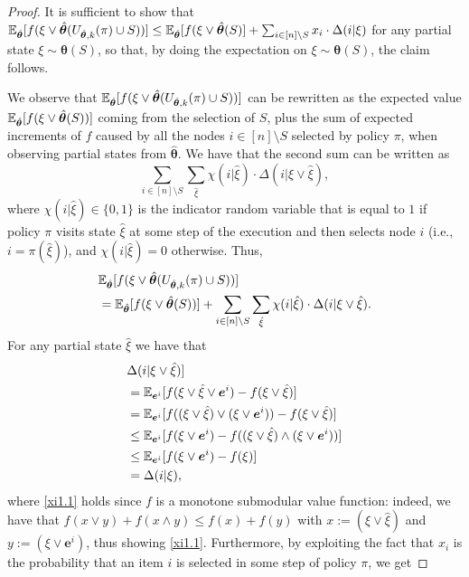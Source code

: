 \begin{proof}
It is sufficient to show that $\mathbb{E}_{\hat{\bm \theta}}[f(\xi\vee\hat{\bm \theta}(U_{\hat{\bm\theta},k}(\pi)\cup S))]\leq \mathbb{E}_{\hat{\bm \theta}}[f(\xi\vee\hat{\bm \theta}(S)]+\sum_{i\in [n]\setminus S}x_i\cdot \Delta(i|\xi)$ for any partial state $\xi\sim \bm\theta(S)$, so that, by doing the expectation on $\xi\sim\bm\theta(S)$, the claim follows. 

We observe that $\mathbb{E}_{\hat{\bm \theta}}[f(\xi\vee\hat{\bm \theta}(U_{\hat{\bm\theta},k}(\pi)\cup S))]$ can be rewritten as the expected value $\mathbb{E}_{\hat{\bm \theta}}[f(\xi\vee\hat{\bm \theta}(S))]$ coming from the selection of $S$, plus the sum of expected increments of $f$ caused by all the nodes $i\in [n]\setminus S$ selected by policy $\pi$, when observing partial states from $\hat{\bm \theta}$. We have that the second sum can be written as  $$\sum_{i\in [n]\setminus S}\sum_{\hat{\xi}}\chi(i|\hat{\xi})\cdot \Delta(i|\xi\vee \hat{\xi}),$$ where $\chi(i|\hat{\xi})\in \{0,1\}$ is the indicator random variable that is equal to $1$ if policy $\pi$ visits state $\hat{\xi}$ at some step of the execution and then selects node $i$ (i.e., $i=\pi(\hat{\xi})$), and $\chi(i|\hat{\xi})=0$ otherwise. Thus,
\begin{align}
&\mathbb{E}_{\hat{\bm \theta}}[f(\xi\vee\hat{\bm \theta}(U_{\hat{\bm\theta},k}(\pi)\cup S))]\nonumber\\
&=\mathbb{E}_{\hat{\bm \theta}}[f(\xi\vee\hat{\bm \theta}(S))]+\sum_{i\in [n]\setminus S}\sum_{\hat{\xi}}\chi(i|\hat{\xi})\cdot \Delta(i|\xi\vee \hat{\xi}).\label{xi1}
\end{align}
For any partial state $\hat{\xi}$ we have that
\begin{align}
&\Delta(i|\xi\vee \hat{\xi})]\nonumber\\
&=\mathbb{E}_{\bm e^i}[f(\xi \vee \hat{\xi}\vee \bm e^{i})-f(\xi\vee \hat{\xi})]\nonumber\\
&=\mathbb{E}_{\bm e^i}[f((\xi \vee \hat{\xi})\vee (\xi\vee \bm e^{i}))-f(\xi\vee \hat{\xi})]\nonumber\\
&\leq \mathbb{E}_{\bm e^i}[f(\xi \vee \bm e^{i})-f((\xi\vee \hat{\xi})\wedge (\xi\vee \bm e^{i}))]\label{xi1.1}\\
&\leq  \mathbb{E}_{\bm e^i}[f(\xi \vee \bm e^{i})-f(\xi)]\nonumber\\
&=\Delta(i|\xi),\label{xi2}
\end{align}
where \eqref{xi1.1} holds since $f$ is a monotone submodular value function: indeed, we have that $f(x\vee y)+f(x\wedge y)\leq f(x)+f(y)$ with $x:=(\xi \vee \hat{\xi})$ and $y:= (\xi\vee \bm e^{i})$, thus showing \eqref{xi1.1}. Furthermore, by exploiting the fact that $x_i$ is the probability that an item $i$ is selected in some step of policy $\pi$, we get

\end{proof}
